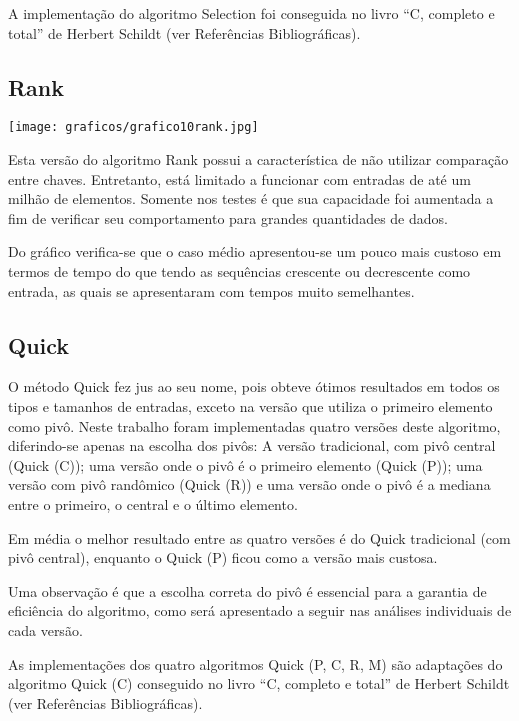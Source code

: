 \documentclass[12pt,a4paper]{article}
\begin{document}
A implementação do algoritmo Selection foi conseguida no livro “C, completo e total” de Herbert Schildt (ver Referências Bibliográficas).







\subsection{Rank}
\begin{center}
\texttt{[image: graficos/grafico10rank.jpg]}
\end{center}

Esta versão do algoritmo Rank possui a característica de não utilizar comparação entre chaves. Entretanto, está limitado a funcionar com entradas de até um milhão de elementos. Somente nos testes é que sua capacidade foi aumentada a fim de verificar seu comportamento para grandes quantidades de dados.

Do gráfico verifica-se que o caso médio apresentou-se um pouco mais custoso em termos de tempo do que tendo as sequências crescente ou decrescente como entrada, as quais se apresentaram com tempos muito semelhantes.







\subsection{Quick}

O método Quick fez jus ao seu nome, pois obteve ótimos resultados em todos os tipos e tamanhos de entradas, exceto na versão que utiliza o primeiro elemento como pivô. Neste trabalho foram implementadas quatro versões deste algoritmo, diferindo-se apenas na escolha dos pivôs: A versão tradicional, com pivô central (Quick (C)); uma versão onde o pivô é o primeiro elemento (Quick (P)); uma versão com pivô randômico (Quick (R)) e uma versão onde o pivô é a mediana entre o primeiro, o central e o último elemento.

Em média o melhor resultado entre as quatro versões é do Quick tradicional (com pivô central), enquanto o Quick (P) ficou como a versão mais custosa.

Uma observação é que a escolha correta do pivô é essencial para a garantia de eficiência do algoritmo, como será apresentado a seguir nas análises individuais de cada versão.

As implementações dos quatro algoritmos Quick (P, C, R, M) são adaptações do algoritmo Quick (C) conseguido no livro “C, completo e total” de Herbert Schildt (ver Referências Bibliográficas).
\end{document}
